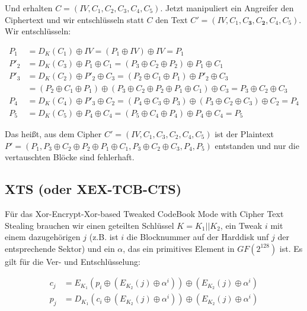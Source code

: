 Und erhalten $C = (IV, C_1, C_2, C_3, C_4, C_5)$. Jetzt manipuliert ein Angreifer den Ciphertext und wir entschlüsseln statt $C$ den Text 
$C'= (IV, C_1, C_\mathbf{3}, C_\mathbf{2}, C_4, C_5)$. Wir entschlüsseln:

\begin{align*}
    P_1 &= D_K(C_1) \oplus IV = (P_1 \oplus IV) \oplus IV = P_1 \\
    P'_2 &= D_K(C_3) \oplus P_1 \oplus C_1 = (P_3 \oplus C_2 \oplus P_2) \oplus P_1 \oplus C_1 \\
    P'_3 &= D_K(C_2) \oplus P'_2 \oplus C_3 = (P_2 \oplus C_1 \oplus P_1) \oplus P'_2 \oplus C_3 \\
         &= (P_2 \oplus C_1 \oplus P_1) \oplus (P_3 \oplus C_2 \oplus P_2 \oplus P_1 \oplus C_1) \oplus C_3 = P_3 \oplus C_2 \oplus C_3\\
    P_4 &= D_K(C_4) \oplus P'_3 \oplus C_2 = (P_4 \oplus C_3 \oplus P_3) \oplus (P_3 \oplus C_2 \oplus C_3) \oplus C_2 = P_4\\
    P_5 &= D_K(C_5) \oplus P_4 \oplus C_4 = (P_5 \oplus C_4 \oplus P_4) \oplus P_4 \oplus C_4 = P_5
\end{align*}

Das heißt, aus dem Cipher $C' = (IV, C_1, C_3, C_2, C_4, C_5)$ ist der Plaintext 
$P' = (P_1, P_3 \oplus C_2 \oplus P_2 \oplus P_1 \oplus C_1,  P_3 \oplus C_2 \oplus C_3, P_4, P_5)$ entstanden und nur die vertauschten Blöcke sind fehlerhaft.

\subsection{XTS (oder XEX-TCB-CTS)}

Für das Xor-Encrypt-Xor-based Tweaked CodeBook Mode with Cipher Text Stealing brauchen wir einen geteilten Schlüssel $K = K_1 || K_2$, ein Tweak $i$ mit einem dazugehörigen 
$j$ (z.B. ist $i$ die Blocknummer auf der Harddisk unf $j$ der entsprechende Sektor) und ein $\alpha$, das ein primitives Element in $GF(2^{128})$ ist. 
Es gilt für die Ver- und Entschlüsselung:

\begin{align*}
    c_j &= E_{K_1}\left(p_i \oplus (E_{K_2}(j) \oplus \alpha^i)\right) \oplus \left(E_{K_2}(j) \oplus \alpha^i\right) \\
    p_j &= D_{K_1}\left(c_i \oplus (E_{K_2}(j) \oplus \alpha^i)\right) \oplus \left(E_{K_2}(j) \oplus \alpha^i\right)
\end{align*}

